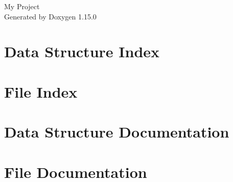 \documentclass[twoside]{book}
\newcommand{\+}{\discretionary{\mbox{\scriptsize$\hookleftarrow$}}{}{}}
\newcommand{\clearemptydoublepage}{%
    \newpage{\pagestyle{empty}\cleardoublepage}%
  }
\begin{document}
  \raggedbottom
    \hypersetup{pageanchor=false,
                bookmarksnumbered=true,
                pdfencoding=unicode
               }
  \begin{titlepage}
  \vspace*{7cm}
  \begin{center}%
  {\Large My Project}\\
  \vspace*{1cm}
  {\large Generated by Doxygen 1.15.0}\\
  \end{center}
  \end{titlepage}
  \clearemptydoublepage
  \tableofcontents
  \clearemptydoublepage
  \hypersetup{pageanchor=true}



\chapter{Data Structure Index}

\chapter{File Index}

\chapter{Data Structure Documentation}


\chapter{File Documentation}








  \backmatter
  \newpage
  \clearemptydoublepage
  \printindex
\end{document}
